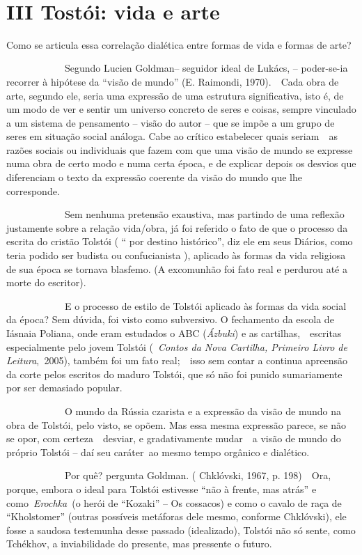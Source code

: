 ~

\section{III Tostói: vida e arte}

Como se articula essa correlação dialética entre formas de vida e formas
de arte?

~~~~~~~~~~~~Segundo Lucien Goldman-- seguidor ideal de Lukács, --
poder-se-ia recorrer à hipótese da ``visão de mundo'' (E. Raimondi,
1970).~~Cada obra de arte, segundo ele, seria uma expressão de uma
estrutura significativa, isto é, de um modo de ver e sentir um universo
concreto de seres e coisas, sempre vinculado a um sistema de pensamento
-- visão do autor -- que se impõe a um grupo de seres em situação social
análoga. Cabe ao crítico estabelecer quais seriam~~as razões sociais ou
individuais que fazem com que uma visão de mundo se expresse numa obra
de certo modo e numa certa época, e de explicar depois os desvios que
diferenciam o texto da expressão coerente da visão do mundo que lhe
corresponde.

~~~~~~~~~~~~Sem nenhuma pretensão exaustiva, mas partindo de uma
reflexão justamente sobre a relação vida/obra, já foi referido o fato de
que o processo da escrita do cristão Tolstói ( `` por destino
histórico'', diz ele em seus Diários, como teria podido ser budista ou
confucianista ), aplicado às formas da vida religiosa de sua época se
tornava blasfemo. (A excomunhão foi fato real e perdurou até a morte do
escritor).

~~~~~~~~~~~~E o processo de estilo de Tolstói aplicado às formas da vida
social da época? Sem dúvida, foi visto como subversivo. O fechamento da
escola de Iásnaia Poliana, onde eram estudados o ABC (\emph{Ázbuki}) e
as cartilhas,~~escritas especialmente pelo jovem Tolstói (~\emph{Contos
da Nova Cartilha, Primeiro Livro de Leitura},\emph{~}2005), também foi
um fato real;~~isso sem contar a continua apreensão da corte pelos
escritos do maduro Tolstói, que só não foi punido sumariamente por ser
demasiado popular.

~~~~~~~~~~~~O mundo da Rússia czarista e a expressão da visão de mundo
na obra de Tolstói, pelo visto, se opõem. Mas essa mesma expressão
parece, se não se opor, com certeza~~desviar, e gradativamente mudar~~a
visão de mundo do próprio Tolstói -- daí seu caráter~ao mesmo tempo
orgânico e dialético.

~~~~~~~~~~~~Por quê? pergunta Goldman. ( Chklóvski, 1967, p. 198)~~Ora,
porque, embora o ideal para Tolstói estivesse ``não à frente, mas
atrás'' e como~\emph{Erochka}~(o herói de ``Kozaki'' -- Os cossacos) e
como o cavalo de raça de ``Kholstomer'' (outras possíveis metáforas dele
mesmo, conforme Chklóvski), ele fosse a saudosa testemunha desse passado
(idealizado), Tolstói não só sente, como Tchékhov, a inviabilidade do
presente, mas pressente o futuro.


